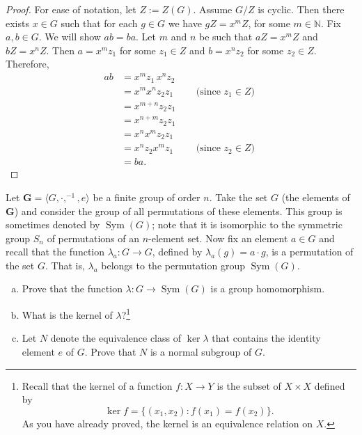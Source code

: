 \documentclass[12pt,reqno]{amsart}
\newcommand{\N}{\ensuremath{\mathbb{N}}}
\newcommand{\bG}{\ensuremath{\mathbf{G}}}
\newcommand{\<}{\ensuremath{\langle}}
\renewcommand{\>}{\ensuremath{\rangle}}
\newcommand{\Sym}{\ensuremath{\operatorname{Sym}}}
\begin{document}
\begin{enumerate}
\begin{enumerate}
\smallskip

\noindent
\begin{proof}
For ease of notation, let $Z := Z(G)$.  Assume 
$G/Z$ is cyclic. Then there exists $x\in G$ such that for each $g\in G$ 
  we have $gZ = x^mZ$, for some $m\in \N$.
  Fix $a, b\in G$.  We will show $ab = ba$.
  Let $m$ and $n$ be such that $aZ = x^mZ$ and $bZ = x^nZ$.
  Then $a = x^mz_1$ for some $z_1 \in Z$ and 
  $b = x^nz_2$ for some $z_2 \in Z$.  Therefore,
  \begin{align*}
    a b &= x^m z_1\, x^n z_2\\
    &= x^m x^n z_2 z_1 \qquad \text{ (since $z_1 \in Z$) }\\
    &= x^{m+n} z_2 z_1\\
    &= x^{n+m} z_2 z_1\\
    &= x^nx^m z_2 z_1\\
    &= x^nz_2 x^m z_1 \qquad \text{ (since $z_2 \in Z$) }\\
    &= b a.
  \end{align*}
\end{proof}
 
\end{enumerate}
 
\end{enumerate}

\newpage

 Let $\bG = \<G, \cdot, ^{-1}, e\>$ be a finite group of order $n$.  
Take the set $G$ (the elements of $\bG$) and consider the group of all
permutations of these elements.  This group is sometimes denoted by $\Sym(G)$;
note that it is isomorphic to the symmetric group $S_n$ of permutations of
an $n$-element set.
Now fix an element $a\in G$ and recall that the function
$\lambda_a: G \rightarrow G$, defined by $\lambda_a(g) = a\cdot g$, is a
permutation of the set $G$.  That is, $\lambda_a$ belongs to the
permutation group $\Sym(G)$.


\bigskip

\begin{enumerate}[(a)]
\item 
Prove that the function $\lambda: G \rightarrow \Sym(G)$ is a group
homomorphism.  

\medskip

\item What is the kernel of $\lambda$?\footnote{Recall that the kernel of a function $f: X \rightarrow Y$ is the subset of
  $X\times X$ defined by 
\[
\ker f = \{(x_1,x_2) : f(x_1) = f(x_2)\}.
\]
As you have already proved, the kernel is an equivalence relation on $X$.}


\medskip

\item Let $N$ denote the equivalence class of $\ker\lambda$ that contains the
  identity element $e$ of $G$.  Prove that $N$ is a normal subgroup of $G$.
\end{enumerate}
\end{document}
